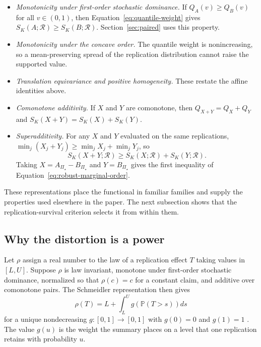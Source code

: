 \documentclass[11pt]{article}
\newcommand{\Regime}{\mathcal{R}}
\newcommand{\PSet}{\Pi_\star}
\newcommand{\Prb}{\mathbb{P}}
\theoremstyle{remark}
\begin{document}
\begin{itemize}
\item \emph{Monotonicity under first-order stochastic dominance.} If $Q_A(v)\geq Q_B(v)$ for all $v\in(0,1)$, then Equation~\eqref{eq:quantile-weight} gives $S_K(A;\Regime)\geq S_K(B;\Regime)$. Section~\ref{sec:paired} uses this property.
\item \emph{Monotonicity under the concave order.} The quantile weight is nonincreasing, so a mean-preserving spread of the replication distribution cannot raise the supported value.
\item \emph{Translation equivariance and positive homogeneity.} These restate the affine identities above.
\item \emph{Comonotone additivity.} If $X$ and $Y$ are comonotone, then $Q_{X+Y}=Q_X+Q_Y$ and $S_K(X+Y)=S_K(X)+S_K(Y)$.
\item \emph{Superadditivity.} For any $X$ and $Y$ evaluated on the same replications, $\min_j(X_j+Y_j)\geq\min_jX_j+\min_jY_j$, so
\[
S_K(X+Y;\Regime)
\geq
S_K(X;\Regime)+S_K(Y;\Regime).
\]
Taking $X=A_{\PSet}-B_{\PSet}$ and $Y=B_{\PSet}$ gives the first inequality of Equation~\eqref{eq:robust-marginal-order}.
\end{itemize}

These representations place the functional in familiar families and supply the properties used elsewhere in the paper. The next subsection shows that the replication-survival criterion selects it from within them.

\subsection{Why the distortion is a power}
\label{app:characterization}

Let $\rho$ assign a real number to the law of a replication effect $T$ taking values in $[L,U]$. Suppose $\rho$ is law invariant, monotone under first-order stochastic dominance, normalized so that $\rho(c)=c$ for a constant claim, and additive over comonotone pairs. The Schmeidler representation then gives
\begin{equation}
\rho(T)
=
L
+
\int_L^U
g\left(\Prb(T>s)\right)
ds
\label{eq:distortion-representation}
\end{equation}
for a unique nondecreasing $g:[0,1]\to[0,1]$ with $g(0)=0$ and $g(1)=1$ \cite{schmeidler1986integral,yaari1987dual}. The value $g(u)$ is the weight the summary places on a level that one replication retains with probability $u$.
\end{document}
